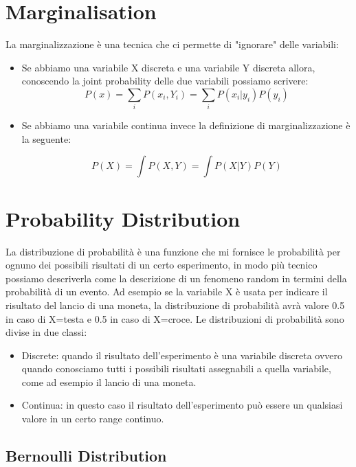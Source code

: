 \documentclass[14pt]{extreport}
\begin{document}
\section{Marginalisation}

La marginalizzazione è una tecnica che ci permette di "ignorare" delle variabili:

\begin{itemize}
	\item Se abbiamo una variabile X discreta e una variabile Y discreta allora, conoscendo la joint probability delle due variabili possiamo
	scrivere:
	      $$P(x) = \sum_i P(x_i, Y_i) = \sum_i P(x_i|y_i)P(y_i)$$

	\item Se abbiamo una variabile continua invece la definizione di marginalizzazione è la seguente:

	      $$P(X) = \int P(X,Y) = \int P(X|Y)P(Y)$$

\end{itemize}

\section{Probability Distribution}

La distribuzione di probabilità è una funzione che mi fornisce le probabilità per ognuno dei possibili risultati di un certo esperimento, in modo più
tecnico possiamo descriverla come la descrizione di un fenomeno random in termini della probabilità di un evento. Ad esempio se la variabile X è usata
per indicare il risultato del lancio di una moneta, la distribuzione di probabilità avrà valore 0.5 in caso di X=testa e 0.5 in caso di X=croce. Le
distribuzioni di probabilità sono divise in due classi:
\begin{itemize}
	\item Discrete: quando il risultato dell'esperimento è una variabile discreta ovvero quando conosciamo tutti i possibili risultati assegnabili a
	      quella variabile, come ad esempio il lancio di una moneta.
	\item Continua: in questo caso il risultato dell'esperimento può essere un qualsiasi valore in un certo range continuo.
\end{itemize}

\subsection{Bernoulli Distribution}
\end{document}
